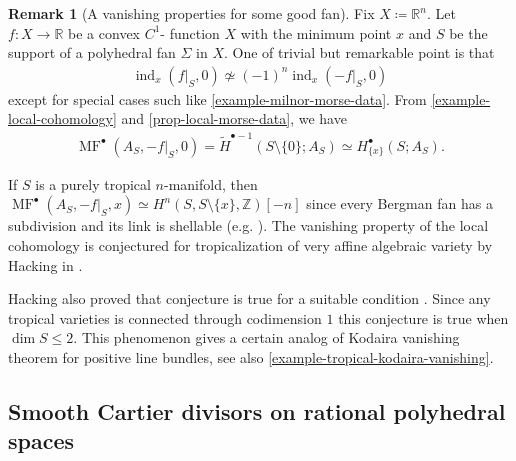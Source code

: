 \documentclass[a4paper,dvipdfmx,reqno,12pt]{amsart}
\theoremstyle{definition}
\newtheorem{remark}[theorem]{Remark}
\newcommand{\deq}{\coloneqq}
\newcommand{\mcal}[1]{\mathcal{#1}}%
\newcommand{\opn}[1]{\operatorname{#1}}
\numberwithin{equation}{section}
\begin{document}




\begin{remark}[{A vanishing properties
for some good fan}]
Fix $X\deq \mathbb{R}^{n}$.
Let $f\colon X\to {\mathbb{R}}$ be a convex $C^{1}$-
function $X$ with the minimum point $x$
and $S$ be the support of 
a polyhedral fan $\Sigma$ in $X$.
One of trivial but remarkable point is that
\begin{align}
\opn{ind}_x(f|_S,0)\not\simeq (-1)^{n}
\opn{ind}_x(-f|_S,0)
\end{align}
except for special cases such like
\cref{example-milnor-morse-data}.
From \cref{example-local-cohomology} and
\cref{prop-local-morse-data}, we have
\begin{align}
\opn{MF}^{\bullet}(A_S,-f|_S,0)=
\tilde{H}^{\bullet-1}(S\setminus \{0\};A_{S})
\simeq H^{\bullet}_{\{x\}}(S;A_S).
\end{align}



If $S$ is a purely tropical $n$-manifold, then 
$\opn{MF}^{\bullet}(A_S,-f|_S,x)\simeq H^{n}(S,S\setminus\{x\},
\mathbb{Z})[-n]$ since every Bergman fan has a subdivision 
\cite[Theorem 1]{MR2185977} and its link is shellable
(e.g. \cite[7.9.1. Theorem]{MR1165544}).
The vanishing property of the local cohomology is conjectured for
tropicalization of very affine algebraic variety by Hacking in
\cite{MR2452307}.

Hacking also proved that conjecture is true for a suitable condition
\cite[Theorem 2.5]{MR2452307}.
Since any tropical varieties is connected
through codimension $1$ \cite[Theorem 3.3.5]{MR3287221}
this conjecture is true when $\dim S \leq 2$.
This phenomenon gives a certain analog of Kodaira vanishing theorem for 
positive line bundles, see 
also \cref{example-tropical-kodaira-vanishing}.
\end{remark}

\subsection{Smooth Cartier divisors on rational 
polyhedral spaces}
\end{document}
